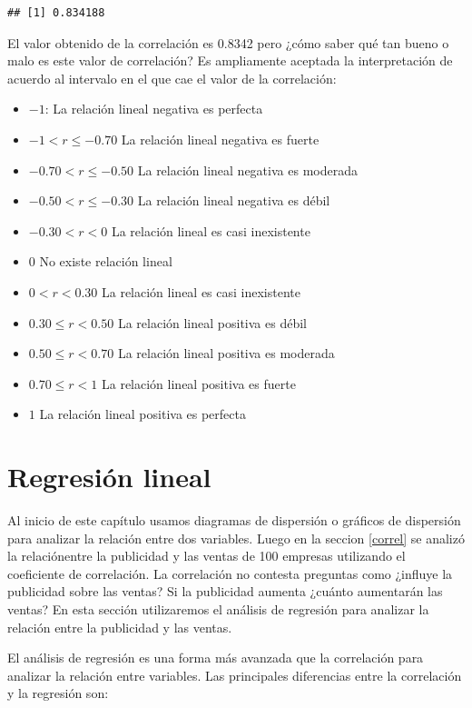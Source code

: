 \documentclass[]{book}
\providecommand{\tightlist}{%
  \setlength{\itemsep}{0pt}\setlength{\parskip}{0pt}}
\begin{document}
\begin{verbatim}
## [1] 0.834188
\end{verbatim}

El valor obtenido de la correlación es 0.8342 pero ¿cómo saber qué tan bueno o malo es este valor de correlación? Es ampliamente aceptada la interpretación de acuerdo al intervalo en el que cae el valor de la correlación:

\begin{itemize}
\tightlist
\item
  \(-1\): La relación lineal negativa es perfecta
\item
  \(-1<r \leq -0.70\) La relación lineal negativa es fuerte
\item
  \(-0.70<r \leq -0.50\) La relación lineal negativa es moderada
\item
  \(-0.50<r \leq -0.30\) La relación lineal negativa es débil
\item
  \(-0.30<r < 0\) La relación lineal es casi inexistente
\item
  \(0\) No existe relación lineal
\item
  \(0<r < 0.30\) La relación lineal es casi inexistente
\item
  \(0.30 \leq r < 0.50\) La relación lineal positiva es débil
\item
  \(0.50 \leq r < 0.70\) La relación lineal positiva es moderada
\item
  \(0.70 \leq r < 1\) La relación lineal positiva es fuerte
\item
  \(1\) La relación lineal positiva es perfecta
\end{itemize}

\hypertarget{regresion-lineal}{%
\section{Regresión lineal}\label{regresion-lineal}}

Al inicio de este capítulo usamos diagramas de dispersión o gráficos de dispersión para analizar la relación entre dos variables. Luego en la seccion \ref{correl} se analizó la relaciónentre la publicidad y las ventas de 100 empresas utilizando el coeficiente de correlación. La correlación no contesta preguntas como ¿influye la publicidad sobre las ventas? Si la publicidad aumenta ¿cuánto aumentarán las ventas? En esta sección utilizaremos el análisis de regresión para analizar la relación entre la publicidad y las ventas.

El análisis de regresión es una forma más avanzada que la correlación para analizar la relación entre variables. Las principales diferencias entre la correlación y la regresión son:
\end{document}
